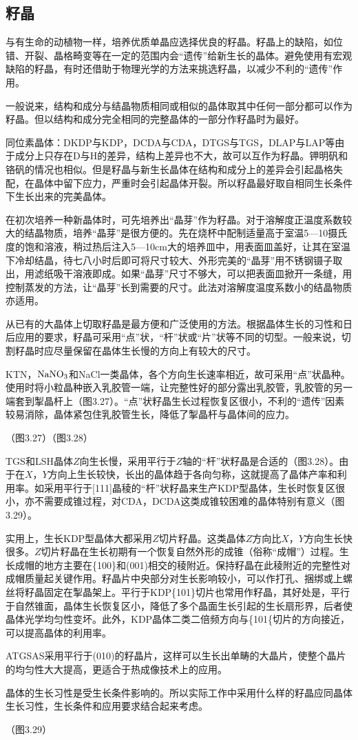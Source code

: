 ﻿\subsection{籽晶}
与有生命的动植物一样，培养优质单晶应选择优良的籽晶。籽晶上的缺陷，如位错、开裂、晶格畸变等在一定的范围内会“遗传”给新生长的晶体。避免使用有宏观缺陷的籽晶，有时还借助于物理光学的方法来挑选籽晶，以减少不利的“遗传”作用。

一般说来，结构和成分与结晶物质相同或相似的晶体取其中任何一部分都可以作为籽晶。但以结构和成分完全相同的完整晶体的一部分作籽晶时为最好。

同位素晶体：DKDP与KDP，DCDA与CDA，DTGS与TGS，DLAP与LAP等由于成分上只存在D与H的差异，结构上差异也不大，故可以互作为籽晶。钾明矾和铬矾的情况也相似。但是籽晶与新生长晶体在结构和成分上的差异会引起晶格失配，在晶体中留下应力，严重时会引起晶体开裂。所以籽晶最好取自相同生长条件下生长出来的完美晶体。

在初次培养一种新晶体时，可先培养出“晶芽”作为籽晶。对于溶解度正温度系数较大的结晶物质，培养“晶芽”是很方便的。先在烧杯中配制适量高于室温5---10摄氏度的饱和溶液，稍过热后注入5---10cm大的培养皿中，用表面皿盖好，让其在室温下冷却结晶，待七八小时后即可将尺寸较大、外形完美的“晶芽”用不锈钢镊子取出，用滤纸吸干溶液即成。如果“晶芽”尺寸不够大，可以把表面皿掀开一条缝，用控制蒸发的方法，让“晶芽”长到需要的尺寸。此法对溶解度温度系数小的结晶物质亦适用。

从已有的大晶体上切取籽晶是最方便和广泛使用的方法。根据晶体生长的习性和日后应用的要求，籽晶可采用“点”状，“杆”状或“片”状等不同的切型。一般来说，切割籽晶时应尽量保留在晶体生长慢的方向上有较大的尺寸。

KTN，$\rm NaNO_3$和NaCl一类晶体，各个方向生长速率相近，故可采用“点”状晶种。使用时将小粒晶种嵌入乳胶管一端，让完整性好的部分露出乳胶管，乳胶管的另一端套到掣晶杆上（图3.27）。“点”状籽晶生长过程恢复区很小，不利的“遗传”因素较易消除，晶体紧包住乳胶管生长，降低了掣晶杆与晶体间的应力。

（图3.27）（图3.28）

TGS和LSH晶体$Z$向生长慢，采用平行于$Z$轴的“杆”状籽晶是合适的（图3.28）。由于在$X$，$Y$方向上生长较快，长出的晶体趋于各向匀称，这就提高了晶体产率和利用率。如采用平行于[111]晶稜的“杆”状籽晶来生产KDP型晶体，生长时恢复区很小，亦不需要成锥过程，对CDA，DCDA这类成锥较困难的晶体特别有意义（图3.29）。

实用上，生长KDP型晶体大都采用$Z$切片籽晶。这类晶体$Z$方向比$X$，$Y$方向生长快很多。$Z$切片籽晶在生长初期有一个恢复自然外形的成锥（俗称“成帽”）过程。生长成帽的地方主要在\{100\}和(001)相交的稜附近。保持籽晶在此稜附近的完整性对成帽质量起关键作用。籽晶片中央部分对生长影响较小，可以作打孔、捆绑或上螺丝将籽晶固定在掣晶架上。平行于KDP\{101\}切片也常用作籽晶，其好处是，平行于自然锥面，晶体生长恢复区小，降低了多个晶面生长引起的生长扇形界，后者使晶体光学均匀性变坏。此外，KDP晶体二类二倍频方向与\{101\{切片的方向接近，可以提高晶体的利用率。

ATGSAS采用平行于(010)的籽晶片，这样可以生长出单畴的大晶片，使整个晶片的均匀性大大提高，更适合于热成像技术上的应用。

晶体的生长习性是受生长条件影响的。所以实际工作中采用什么样的籽晶应同晶体生长习性，生长条件和应用要求结合起来考虑。

（图3.29）